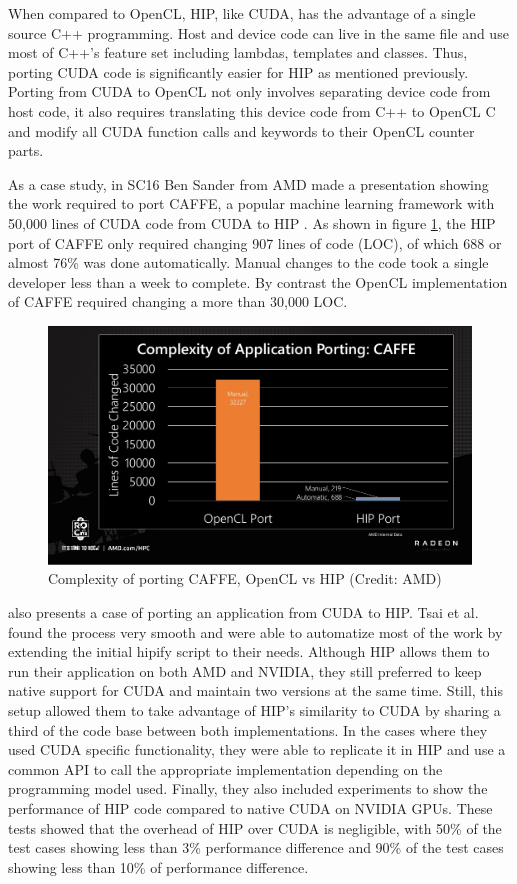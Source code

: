 When compared to OpenCL, HIP, like CUDA, has the advantage of a single source C++ programming. Host and device code can live in the same file and use most of C++'s feature set including lambdas, templates and classes. Thus, porting CUDA code is significantly easier for HIP as mentioned previously. Porting from CUDA to OpenCL not only involves separating device code from host code, it also requires translating this device code from C++ to OpenCL C and modify all CUDA function calls and keywords to their OpenCL counter parts.

As a case study, in SC16 Ben Sander from AMD made a presentation showing the work required to port CAFFE, a popular machine learning framework with 50,000 lines of CUDA code from CUDA to HIP \cite{caffe_rocm_port}. As shown in figure \ref{fig:caffe-rocm-port}, the HIP port of CAFFE only required changing 907 lines of code (LOC), of which 688 or almost 76\% was done automatically. Manual changes to the code took a single developer less than a week to complete. By contrast the OpenCL implementation of CAFFE required changing a more than 30,000 LOC.

\begin{figure}[ht]
    \centering
    \includegraphics[width=\textwidth]{img/caffe-rocm-port.png}
    \captionsetup{justification=centering}
    \caption{Complexity of porting CAFFE, OpenCL vs HIP (Credit: AMD)}
    \label{fig:caffe-rocm-port}
\end{figure}

\cite{ginkgo_rocm_port} also presents a case of porting an application from CUDA to HIP. Tsai et al. found the process very smooth and were able to automatize most of the work by extending the initial hipify script to their needs. Although HIP allows them to run their application on both AMD and NVIDIA, they still preferred to keep native support for CUDA and maintain two versions at the same time. Still, this setup allowed them to take advantage of HIP's similarity to CUDA by sharing a third of the code base between both implementations. In the cases where they used CUDA specific functionality, they were able to replicate it in HIP and use a common API to call the appropriate implementation depending on the programming model used. Finally, they also included experiments to show the performance of HIP code compared to native CUDA on NVIDIA GPUs. These tests showed that the overhead of HIP over CUDA is negligible, with 50\% of the test cases showing less than 3\% performance difference and 90\% of the test cases showing less than 10\% of performance difference.

